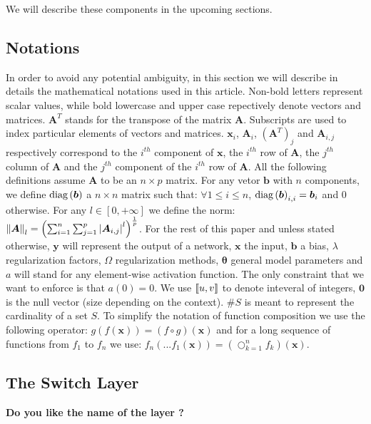 We will describe these components in the upcoming sections.

\subsection{Notations}

\par In order to avoid any potential ambiguity, in this section we will
describe in details the mathematical notations used in this article. Non-bold
letters represent scalar values, while bold lowercase and upper case
repectively denote vectors and matrices. $\bm{A}^T$ stands for the transpose of
the matrix $\bm{A}$. Subscripts are used to index particular elements of
vectors and matrices. $\bm{x}_i$, $\bm{A}_i$, $\left(\bm{A}^T\right)_j$ and
$\bm{A}_{i,j}$ respectively correspond to the $i^{th}$ component of $\bm{x}$,
the $i^{th}$ row of $\bm{A}$, the $j^{th}$ column of $\bm{A}$ and the $j^{th}$
component of the $i^{th}$ row of $\bm{A}$. All the following definitions assume
$\bm{A}$ to be an $n\times p$ matrix.  For any vetor $\bm{b}$ with $n$
components, we define $\text{diag}\left(\bm{b}\right)$ a $n\times n$ matrix such that: $\forall
1 \leq i \leq n$, $\text{diag}\left(\bm{b}\right)_{i, i} = \bm{b}_i$ and $0$ otherwise.  For any $l \in \left[0, +\infty\right]$ we define the norm: $\left\lVert\bm{A}\right\rVert_l =
\left(\sum_{i=1}^n \sum_{j=1}^p \left|\bm{A}_{i, j}\right|^l\right)^{\frac{1}{p}}$. For the rest of this paper and unless stated otherwise, $\bm{y}$ will represent the output of a network, $\bm{x}$ the input, $\bm{b}$ a bias, $\lambda$ regularization factors, $\Omega$ regularization methods, $\bm{\theta}$ general model parameters and $a$ will stand for any element-wise activation function. The only constraint that we want to enforce is that $a(0) = 0$. We use $\left\llbracket u, v\right\rrbracket$ to denote inteveral of integers, $\bm{0}$ is the null vector (size depending on the context). $\#S$ is meant to represent the cardinality of a set $S$. To simplify the notation of function composition we use the following operator: $g(f(\bm{x})) = (f \circ g)(\bm{x})$ and for a long sequence of functions from $f_1$ to $f_n$ we use: $f_n(...f_1(\bm{x})) = \left(\bigcirc_{k = 1}^n f_k\right)(\bm{x})$.

\subsection{The Switch Layer}

\textbf{Do you like the name of the layer ?}

